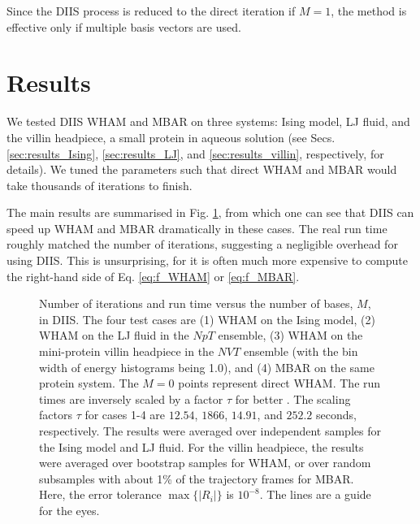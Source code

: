 \documentclass{gMOS2e}
\begin{document}
Since the DIIS process is reduced
to the direct iteration
if $M = 1$,
the method is effective
only if multiple basis vectors are used.
%




\section{Results}





We tested DIIS WHAM and MBAR on three systems:
Ising model, LJ fluid,
and the villin headpiece, a small protein in aqueous solution
(see Secs.
\ref{sec:results_Ising}, \ref{sec:results_LJ}, and
\ref{sec:results_villin},
respectively,
for details).
%
We tuned the parameters
such that direct WHAM and MBAR
would take thousands of iterations
to finish.



The main results
are summarised
in Fig. \ref{fig:nsnt},
from which one can see that
DIIS can speed up WHAM and MBAR
dramatically in these cases.
%
The real run time roughly matched
the number of iterations,
suggesting a negligible overhead for using DIIS.
%
This is unsurprising,
for it is often much more expensive to compute
the right-hand side of
Eq. \eqref{eq:f_WHAM} or \eqref{eq:f_MBAR}.



\begin{figure}[h]
\begin{center}
  \caption{
    \label{fig:nsnt}
    Number of iterations
    and run time
    versus the number of bases, $M$,
    in DIIS.
    The four test cases are
    (1) WHAM on the Ising model,
    (2) WHAM on the LJ fluid in the $NpT$ ensemble,
    (3) WHAM on the mini-protein villin headpiece in the $NVT$ ensemble
    (with the bin width of energy histograms being 1.0), and
    (4) MBAR on the same protein system.
    The $M = 0$ points represent direct WHAM.
    The run times are inversely scaled
    by a factor $\tau$
    for better .
    The scaling factors $\tau$ for cases 1-4 are
    $12.54$, $1866$, $14.91$, and $252.2$ seconds,
    respectively.
    The results were averaged
    over independent samples
    for the Ising model and LJ fluid.
    For the villin headpiece,
    the results were averaged over
    bootstrap\cite{
    newman, efron1979, hub2010}
    samples for WHAM,
    or over random subsamples with about 1\% of the trajectory frames
    for MBAR.
    Here, the error tolerance
    $\max \{ |R_i| \}$ is $10^{-8}$.
    The lines are a guide for the eyes.
  }
\end{center}
\end{figure}
\end{document}
